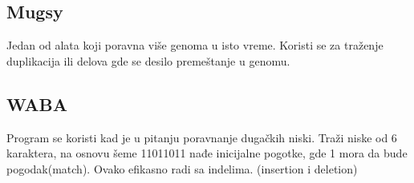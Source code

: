 \subsection{Mugsy}
Jedan od alata koji poravna više genoma u isto vreme. Koristi se za traženje duplikacija ili delova gde se desilo premeštanje u genomu.

\subsection{WABA}
Program se koristi kad je u pitanju poravnanje dugačkih niski. Traži niske od 6 karaktera, na osnovu šeme 11011011 nađe inicijalne pogotke, gde 1 mora da bude pogodak(match). Ovako efikasno radi sa indelima. (insertion i deletion)
